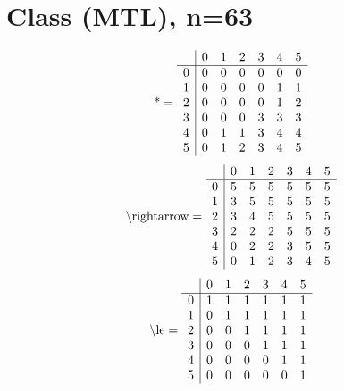 \documentclass[11pt]{article}
\begin{document}
\section{Class (MTL), n=63}
\[\text{*} = 
\begin{array}{r | r r r r r r}
 & 0 & 1 & 2 & 3 & 4 & 5 \\ \hline
0 & 0 & 0 & 0 & 0 & 0 & 0 \\
1 & 0 & 0 & 0 & 0 & 1 & 1 \\
2 & 0 & 0 & 0 & 0 & 1 & 2 \\
3 & 0 & 0 & 0 & 3 & 3 & 3 \\
4 & 0 & 1 & 1 & 3 & 4 & 4 \\
5 & 0 & 1 & 2 & 3 & 4 & 5 \\
\end{array}
\]
\[\text{\textbackslash rightarrow} = 
\begin{array}{r | r r r r r r}
 & 0 & 1 & 2 & 3 & 4 & 5 \\ \hline
0 & 5 & 5 & 5 & 5 & 5 & 5 \\
1 & 3 & 5 & 5 & 5 & 5 & 5 \\
2 & 3 & 4 & 5 & 5 & 5 & 5 \\
3 & 2 & 2 & 2 & 5 & 5 & 5 \\
4 & 0 & 2 & 2 & 3 & 5 & 5 \\
5 & 0 & 1 & 2 & 3 & 4 & 5 \\
\end{array}
\]
\[\text{\textbackslash le} = 
\begin{array}{r | r r r r r r}
 & 0 & 1 & 2 & 3 & 4 & 5 \\ \hline
0 & 1 & 1 & 1 & 1 & 1 & 1 \\
1 & 0 & 1 & 1 & 1 & 1 & 1 \\
2 & 0 & 0 & 1 & 1 & 1 & 1 \\
3 & 0 & 0 & 0 & 1 & 1 & 1 \\
4 & 0 & 0 & 0 & 0 & 1 & 1 \\
5 & 0 & 0 & 0 & 0 & 0 & 1 \\
\end{array}
\]
\end{document}
